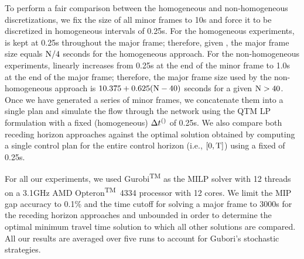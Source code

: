 To perform a fair comparison between the homogeneous and non-homogeneous
discretizations, we fix the size of all minor frames to 10s and force it to be
discretized in homogeneous intervals of 0.25s.
%
For the homogeneous experiments, \DT[] is kept at 0.25s throughout the major
frame; therefore, given \Nn, the major frame size equals $\Nn/4$ seconds for the
homogeneous approach.
%
For the non-homogeneous experiments, \DT[] linearly increases from
0.25s at the end of the minor frame to 1.0s at the end of the major frame;
therefore, the major frame size used by the non-homogeneous approach
is $10.375 + 0.625(\Nn-40)$ seconds for a given $\Nn > 40$.
%
%
Once we have generated a series of minor frames, we concatenate them into a
single plan and simulate the flow through the network using the QTM LP
formulation with a fixed (homogeneous) $\DT[]$ of 0.25s.
%
%
We also compare both receding horizon approaches against the optimal solution
obtained by computing a single control plan for the entire control horizon
(i.e., $[0,\TMAX]$) using a fixed \DT[] of 0.25s.


For all our experiments, we used Gurobi\textsuperscript{TM} as the MILP solver with
12 threads on a 3.1GHz AMD Opteron\textsuperscript{TM}~4334 processor with 12
cores.
%
We limit the MIP gap accuracy to 0.1\% and the time cutoff for solving a major
frame to 3000s for the receding horizon approaches and unbounded in order to
determine the optimal minimum travel time solution to which all other solutions are compared.
%
%
All our results are averaged over five runs to account for Gubori's
stochastic strategies.



